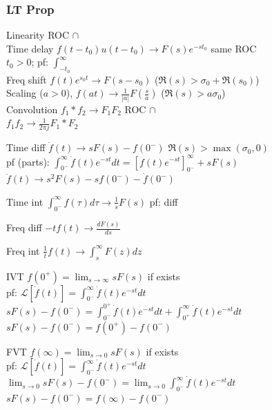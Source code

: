 \documentclass[4pt]{article}
\theoremstyle{definition}
\theoremstyle{definition}
\newcommand{\ra}{\rightarrow}
\newcommand{\ulint}{\int_{0^-}^{\infty}}    %
\begin{document}
\begin{landscape}
\begin{multicols}{3}
\subsubsection*{LT Prop}
    Linearity \hfill ROC $\cap$\\
    Time delay \(f(t-t_0) u(t-t_0) \ra F(s) e^{-st_0}\)  \hfill same ROC\\    %
        $t_0 > 0$; pf: \(\int_{-t_0}^{\infty}\)\\ %
    Freq shift \(f(t) e^{s_0 t} \ra F(s-s_0)\) ($\Re(s) > \sigma_0 + \Re(s_0)$)\\
    Scaling ($a > 0$), \(f(at) \ra \frac{1}{|a|} F(\frac{s}{a})\) ($\Re(s) > a\sigma_0 $)\\   %
    Convolution \(f_1 * f_2 \ra F_1 F_2\) \hfill ROC $\cap$\\
    \(f_1 f_2 \ra \frac{1}{2\pi j} F_1 * F_2\)

    Time diff \(\dot{f}(t) \ra sF(s) - f(0^-)\) \hfill $\Re(s) > \max(\sigma_0, 0)$\\     %
        pf (parts): \(\ulint \dot{f}(t) e^{-st} dt = \left[f(t) e^{-st} \right]^{\infty}_{0^-} + s F(s)\)\\    %
    \(\ddot{f}(t) \ra s^2 F(s) - sf(0^-) - \dot{f}(0^-)\)   %

    Time int \(\ulint f(\tau) d\tau \ra \frac{1}{s} F(s)\) pf: diff     %

    Freq diff \(-t f(t) \ra \frac{dF(s)}{ds}\)          %

    Freq int \(\frac{1}{t}f(t) \ra \int_s^{\infty}F(z) dz\)

    IVT \(f(0^+) = \lim_{s\ra \infty} sF(s)\) if exists\\
        pf: \(\mathcal L[\dot{f} (t)] = \ulint \dot f(t) e^{-st} dt\)\\ %
        \(sF(s) - f(0^-) = \int_{0^-}^{0^+} \dot f (t) e^{-st} dt + \int _{0^+}^{\infty} \dot f(t) e^{-st} dt \)\\    %
        \(sF(s) - f(0^-) = f(0^+) - f(0^-)\)    %

    FVT \(f(\infty) = \lim_{s\ra 0} sF(s)\) if exists\\
        pf: \(\mathcal L[\dot{f} (t)] = \ulint \dot f(t) e^{-st} dt\)\\ %
        \(\lim_{s\ra 0} sF(s) - f(0^-) = \lim_{s\ra 0}\ulint \dot f (t) e^{-st} dt\)\\    %
        \(sF(s) - f(0^-) = f(\infty) - f(0^-)\)    %

\end{multicols}
\end{landscape}
\end{document}
